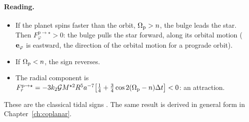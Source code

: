 \paragraph{Reading.}
\begin{itemize}
  \item If the planet spins faster than the orbit, $\Omega_{\mathrm p}>n$, the bulge leads the star. Then $F^{\mathrm p\to\star}_\varphi>0$: the bulge pulls the star forward, along its orbital motion ($\mathbf e_\varphi$ is eastward, the direction of the orbital motion for a prograde orbit).
  \item If $\Omega_{\mathrm p}<n$, the sign reverses.
  \item The radial component is $F^{\mathrm p\to\star}_r=-3k_2\mathcal{G} M^{\star2}R^5a^{-7}\big[\tfrac14+\tfrac34\cos2(\Omega_{\mathrm p}-n)\Delta t\big]<0$: an attraction.
\end{itemize}
These are the classical tidal signs \citep{Hut1981}. The same result is derived in general form in Chapter~\ref{ch:coplanar}.
